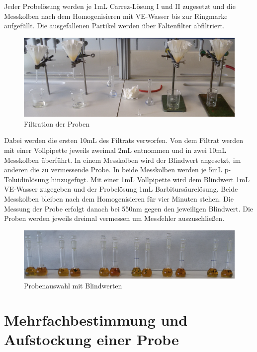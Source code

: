 Jeder Probelösung werden je 1mL Carrez-Lösung I und II zugesetzt und die Messkolben nach dem Homogenisieren mit VE-Wasser bis zur Ringmarke aufgefüllt. Die ausgefallenen Partikel werden über Faltenfilter abfiltriert. \\
\begin{figure}[htbp]
	\centering
		\includegraphics[width=1.00\textwidth]{../Bilder/20150427_131648.jpg}
	\caption{Filtration der Proben}
	\label{fig:Filtration}
\end{figure}
Dabei werden die ersten 10mL des Filtrats verworfen. Von dem Filtrat werden mit einer Vollpipette jeweils zweimal 2mL entnommen und in zwei 10mL Messkolben überführt. In einem Messkolben wird der Blindwert angesetzt, im anderen die zu vermessende Probe. In beide Messkolben werden je 5mL p-Toluidinlösung hinzugefügt. Mit einer 1mL Vollpipette wird dem Blindwert 1mL VE-Wasser zugegeben und der Probelösung 1mL Barbitursäurelösung. Beide Messkolben bleiben nach dem Homogenisieren für vier Minuten stehen. Die Messung der Probe erfolgt danach bei 550nm gegen den jeweiligen Blindwert. Die Proben werden jeweils dreimal vermessen um Messfehler auszuschließen.
\begin{figure}[htbp]
	\centering
		\includegraphics[width=1.00\textwidth]{../Bilder/20150427_140221(0).jpg}
	\caption{Probenauswahl mit Blindwerten}
	\label{fig:Probenauswahl}
\end{figure}

\newpage
\section{Mehrfachbestimmung und Aufstockung einer Probe}

